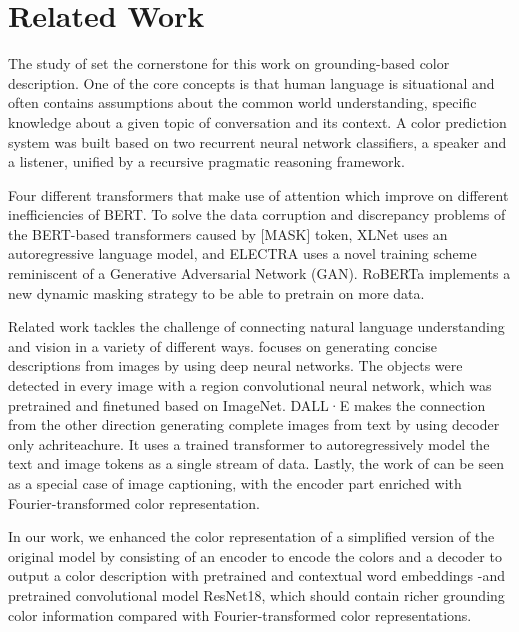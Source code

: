 \section{Related Work}

The study of \citep{monroe-2017-colors} set the cornerstone for this work on grounding-based color description. One of the core concepts is that human language is situational and often contains assumptions about the common world understanding, specific knowledge about a given topic of conversation and its context. A color prediction system was built based on two recurrent neural network classifiers, a speaker and a listener, unified by a recursive pragmatic reasoning framework.

\par
Four different transformers that make use of attention which improve on different inefficiencies of BERT. To solve the data corruption and discrepancy problems of the BERT-based transformers caused by [MASK] token, XLNet uses an autoregressive language model, and ELECTRA uses a novel training scheme reminiscent of a Generative Adversarial Network (GAN). RoBERTa implements a new dynamic masking strategy to be able to pretrain on more data.

\par
Related work tackles the challenge of connecting natural language understanding and vision in a variety of different ways. \citep{karpathy-2014-image_descriptions} focuses on generating concise descriptions from images by using deep neural networks. The objects were detected in every image with a region convolutional neural network, which was  pretrained and finetuned based on ImageNet. DALL·E makes the connection from the other direction generating complete images from text by using decoder only achriteachure. It uses a trained transformer to autoregressively model the text and image tokens as a single stream of data. Lastly, the work of \citep{monroe-2017-colors} can be seen as a special case of image captioning, with the encoder part enriched with Fourier-transformed color representation.

\par
In our work, we enhanced the color representation of a simplified version of the original model by \citep{monroe-2017-colors} consisting of an encoder to encode the colors and a decoder to output a color description with pretrained and contextual word embeddings -and pretrained convolutional model ResNet18, which should contain richer grounding color information compared with Fourier-transformed color representations.

